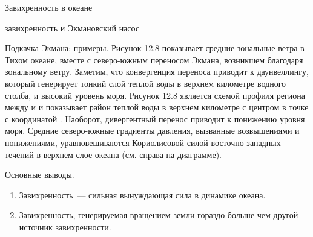 \begin{chapter}{Завихренность в океане}
\begin{section}{завихренность и Экмановский насос}
\begin{paragraph}{Подкачка Экмана: примеры.}
Рисунок 12.8 показывает средние зональные ветра в Тихом океане, вместе
с северо-южным переносом Экмана, возникшем благодаря зональному
ветру. Заметим, что конвергенция переноса приводит к даунвеллингу,
который генерирует тонкий слой теплой воды в верхнем километре водного
столба, и высокий уровень моря. Рисунок 12.8 является схемой профиля
региона между  и  и показывает район
теплой воды в верхнем километре с центром в точке с координатой
. Наоборот, дивергентный перенос приводит к понижению
уровня моря. Средние северо-южные градиенты давления, вызванные
возвышениями и понижениями, уравновешиваются Кориолисовой силой
восточно-западных течений в верхнем слое океана (см. справа на
диаграмме).
%
\end{paragraph}
\end{section}

\begin{section}{Основные выводы.}
\begin{enumerate}
\item
Завихренность~--- сильная вынуждающая сила в динамике океана. 
%

\item
Завихренность, генерируемая вращением земли гораздо больше чем другой
источник завихренности.
%


\end{enumerate}
\end{section}
\end{chapter}
